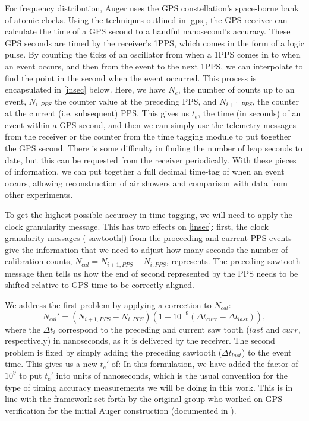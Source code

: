 For frequency distribution, Auger uses the GPS constellation's space-borne bank of atomic clocks. Using the techniques outlined in \autoref{gps}, the GPS receiver can calculate the time of a GPS second to a handful nanosecond's accuracy. These GPS seconds are timed by the receiver's 1PPS, which comes in the form of a logic pulse. By counting the ticks of an oscillator from when a 1PPS comes in to when an event occurs, and then from the event to the next 1PPS, we can interpolate to find the point in the second when the event occurred. This process is encapsulated in \autoref{insec} below. 
Here, we have $N_e$, the number of counts up to an event, $N_{i,PPS}$ the counter value at the preceding PPS, and $N_{i+1,PPS}$, the counter at the current (i.e. subsequent) PPS. This gives us $t_e$, the time (in seconds) of an event within a GPS second, and then we can simply use the telemetry messages from the receiver or the counter from the time tagging module to put together the GPS second. There is some difficulty in finding the number of leap seconds to date, but this can be requested from the receiver periodically. With these pieces of information, we can put together a full decimal time-tag of when an event occurs, allowing reconstruction of air showers and comparison with data from other experiments.

To get the highest possible accuracy in time tagging, we will need to apply the clock granularity message. This has two effects on \autoref{insec}: first, the clock granularity messages (\autoref{sawtooth}) from the proceeding and current PPS events give the information that we need to adjust how many seconds the number of calibration counts, $N_{cal}=N_{i+1,PPS}-N_{i,PPS}$, represents. The preceding sawtooth message then tells us how the end of second represented by the PPS needs to be shifted relative to GPS time to be correctly aligned.

We address the first problem by applying a correction to $N_{cal}$:
$$N_{cal}'=\left(N_{i+1,PPS}-N_{i,PPS}\right)\left(1+10^{-9}(\Delta t_{curr}-\Delta t_{last})\right),$$
where the $\Delta t_i$ correspond to the preceding and current saw tooth ($last$ and $curr$, respectively) in nanoseconds, as it is delivered by the receiver. The second problem is fixed by simply adding the preceding sawtooth ($\Delta t_{last}$) to the event time. This gives us a new $t_e'$ of:
In this formulation, we have added the factor of $10^9$ to put $t_e'$ into units of nanoseconds, which is the usual convention for the type of timing accuracy measurements we will be doing in this work. This is in line with the framework set forth by the original group who worked on GPS verification for the initial Auger construction (documented in \textcite{firsttag}).

